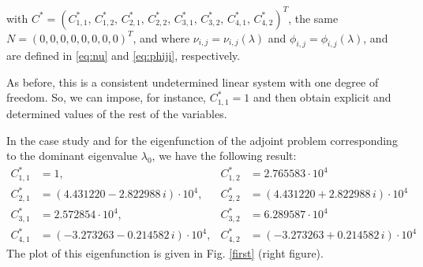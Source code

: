 \documentclass[a4paper]{article}
\newcommand{\X}[3]{#1_{#3,#2}}
\newcommand{\Xe}[3]{#1^*_{#3,#2}}
\numberwithin{equation}{section}
\begin{document}
\normalsize
with $C^*=\left( \Xe{C}{1}{1},\, \Xe{C}{2}{1},\, \Xe{C}{1}{2},\, \Xe{C}{2}{2},\, \Xe{C}{1}{3},\, \Xe{C}{2}{3},\,\Xe{C}{1}{4},\, \Xe{C}{2}{4} \right)^T$, the same $N=\left( 0,0,0,0,0,0,0,0 \right)^T$, and where $\X{\nu}{j}{i}=\X{\nu}{j}{i}(\lambda)$ and $\X{\phi}{j}{i}=\X{\phi}{j}{i}(\lambda)$, and are defined in \eqref{eq:nu} and \eqref{eq:phiji}, respectively.

As before, this is a consistent undetermined linear system with one degree of freedom. So, we can impose, for instance, $\Xe{C}{1}{1} =1$ and then obtain explicit and determined values of the rest of the variables.

In the case study and for the eigenfunction of the adjoint problem corresponding to the dominant eigenvalue $\lambda_0$, we have the following result:
\begin{align*}%
\Xe{C}{1}{1} &= 1, &\Xe{C}{2}{1} &= 2.765583\cdot 10^4 \nonumber \\
\Xe{C}{1}{2} &= (4.431220 - 2.822988\,i)\cdot 10^4, & \Xe{C}{2}{2} &= (4.431220 + 2.822988\,i)\cdot 10^4\nonumber \\
\Xe{C}{1}{3} &= 2.572854\cdot 10^4,  &\Xe{C}{2}{3} &= 6.289587\cdot 10^4\nonumber \\
\Xe{C}{1}{4} &= (-3.273263 - 0.214582\,i)\cdot 10^4,&\Xe{C}{2}{4} &= (-3.273263 + 0.214582\,i)\cdot 10^4
\end{align*}
The plot of this eigenfunction is given in Fig. \ref{first} (right figure).
\end{document}
